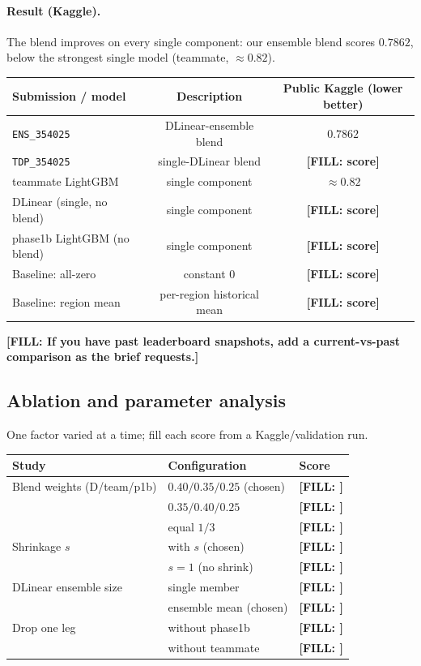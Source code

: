 \documentclass[11pt]{article}
\newcommand{\FILL}[1]{{\color{red}\textbf{[FILL: #1]}}}
\begin{document}
\paragraph{Result (Kaggle).} The blend improves on every single component: our ensemble blend scores
$0.7862$, below the strongest single model (teammate, $\approx0.82$).
\begin{center}
\begin{tabular}{lcc}
\toprule
Submission / model & Description & Public Kaggle (lower better) \\
\midrule
\texttt{ENS\_354025} & DLinear-ensemble blend & $0.7862$ \\
\texttt{TDP\_354025} & single-DLinear blend & \FILL{score} \\
\addlinespace
teammate LightGBM & single component & $\approx 0.82$ \\
DLinear (single, no blend) & single component & \FILL{score} \\
phase1b LightGBM (no blend) & single component & \FILL{score} \\
\addlinespace
Baseline: all-zero & constant $0$ & \FILL{score} \\
Baseline: region mean & per-region historical mean & \FILL{score} \\
\bottomrule
\end{tabular}
\end{center}
\FILL{If you have past leaderboard snapshots, add a current-vs-past comparison as the brief requests.}

\subsection{Ablation and parameter analysis}
One factor varied at a time; fill each score from a Kaggle/validation run.
\begin{center}
\begin{tabular}{lll}
\toprule
Study & Configuration & Score \\
\midrule
Blend weights (D/team/p1b) & $0.40/0.35/0.25$ (chosen) & \FILL{} \\
                           & $0.35/0.40/0.25$ & \FILL{} \\
                           & equal $1/3$ & \FILL{} \\
Shrinkage $s$ & with $s$ (chosen) & \FILL{} \\
              & $s=1$ (no shrink) & \FILL{} \\
DLinear ensemble size & single member & \FILL{} \\
                      & ensemble mean (chosen) & \FILL{} \\
Drop one leg & without phase1b & \FILL{} \\
             & without teammate & \FILL{} \\
\bottomrule
\end{tabular}
\end{center}
\end{document}
